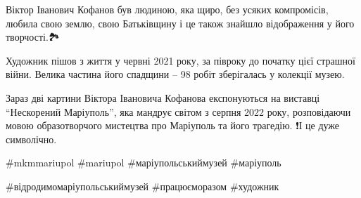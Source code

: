 Віктор Іванович Кофанов був людиною, яка щиро, без усяких компромісів, любила
свою землю, свою Батьківщину і це також  знайшло відображення у його
творчості.🏞

Художник пішов з життя у червні 2021 року, за півроку до початку цієї страшної
війни. Велика частина його спадщини – 98 робіт зберігалась у колекції музею. 

Зараз дві картини Віктора Івановича Кофанова експонуються на виставці
\enquote{Нескорений Маріуполь}, яка мандрує світом з серпня 2022 року, розповідаючи
мовою образотворчого мистецтва про Маріуполь та його трагедію. ❗️І це дуже
символічно.

\#mkmmariupol \#mariupol \#маріупольськиймузей \#маріуполь

\#відродимомаріупольськиймузей \#працюєморазом \#художник

